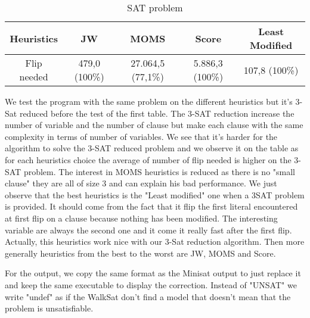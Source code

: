 \documentclass[a4paper]{article}
\begin{document}
\begin{table}[h!]
\begin{center}
\begin{tabular}{c||c c c c}
         Heuristics & JW  & MOMS  & Score  & Least Modified  \\
        \hline
        \hline
         Flip needed & 479,0 (100\%) & 27.064,5 (77,1\%) & 5.886,3 (100\%)  & 107,8 (100\%)\\

\end{tabular}
\caption{SAT problem}
\end{center}
\end{table}

\newpage

We test the program with the same problem on the different heuristics but it's 3-Sat reduced before the test of the first table. The 3-SAT reduction increase the number of variable and the number of clause but make each clause with the same complexity in terms of number of variables. We see that it's harder for the algorithm to solve the 3-SAT reduced problem and we observe it on the table as for each heuristics choice the average of number of flip needed is higher on the 3-SAT problem. The interest in MOMS heuristics is reduced as there is no "small clause" they are all of size 3 and can explain his bad performance.
We just observe that the best heuristics is the "Least modified" one when a 3SAT problem is provided. It should come from the fact that it flip the first literal encountered at first flip on a clause because nothing has been modified. The interesting variable are always the second one and it come it really fast after the first flip. Actually, this heuristics work nice with our 3-Sat reduction algorithm. Then more generally heuristics from the best to the worst are JW, MOMS and Score.

\medskip

For the output, we copy the same format as the Minisat output to just replace it and keep the same executable to display the correction. Instead of "UNSAT" we write "undef" as if the WalkSat don't find a model that doesn't mean that the problem is unsatisfiable.
\end{document}
